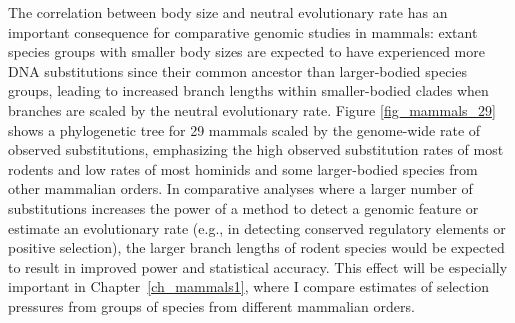 The correlation between body size and neutral evolutionary rate has an
important consequence for comparative genomic studies in mammals:
extant species groups with smaller body sizes are expected to have
experienced more DNA substitutions since their common ancestor than
larger-bodied species groups, leading to increased branch lengths
within smaller-bodied clades when branches are scaled by the neutral
evolutionary rate. Figure \ref{fig_mammals_29} shows a phylogenetic
tree for 29 mammals scaled by the genome-wide rate of observed
substitutions, emphasizing the high observed substitution rates of
most rodents and low rates of most hominids and some larger-bodied
species from other mammalian orders. In comparative analyses where a
larger number of substitutions increases the power of a method to
detect a genomic feature or estimate an evolutionary rate (e.g., in
detecting conserved regulatory elements or positive selection), the
larger branch lengths of rodent species would be expected to result in
improved power and statistical accuracy. This effect will be
especially important in Chapter~\ref{ch_mammals1}, where I compare \sw
estimates of selection pressures from groups of species from different
mammalian orders.

